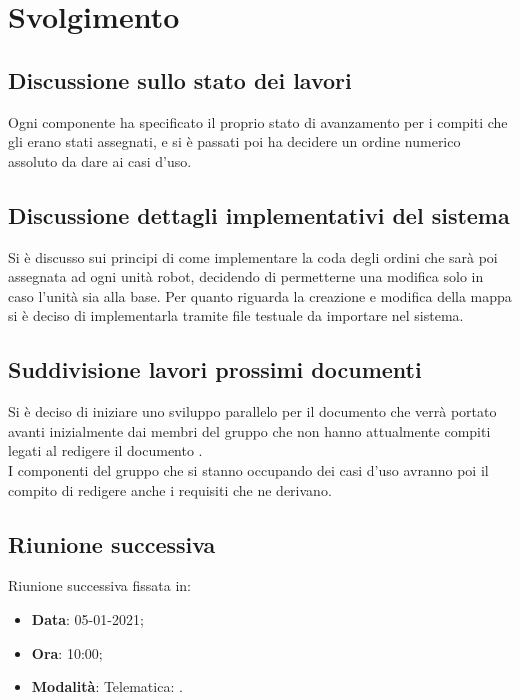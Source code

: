 \documentclass[]{article}
\begin{document}
	\newpage

	\section{Svolgimento}
		\subsection{Discussione sullo stato dei lavori}
        Ogni componente ha specificato il proprio stato di avanzamento per i compiti che gli erano stati assegnati, e si è passati poi ha decidere un ordine numerico assoluto da dare ai casi d'uso.\\

        \subsection{Discussione dettagli implementativi del sistema}
        Si è discusso sui principi di come implementare la coda degli ordini che sarà poi assegnata ad ogni unità robot, decidendo di permetterne una modifica solo in caso l'unità sia alla base. Per quanto riguarda la creazione e modifica della mappa si è deciso di implementarla tramite file testuale da importare nel sistema.\\
        
        \subsection{Suddivisione lavori prossimi documenti}
        Si è deciso di iniziare uno sviluppo parallelo per il documento  che verrà portato avanti inizialmente dai membri del gruppo che non hanno attualmente compiti legati al redigere il documento . \\
        I componenti del gruppo che si stanno occupando dei casi d'uso avranno poi il compito di redigere anche i requisiti che ne derivano.\\

		\subsection{Riunione successiva}
		Riunione successiva fissata in:
		\begin{itemize}
			\item \textbf{Data}: 05-01-2021;
			\item \textbf{Ora}: 10:00;
			\item \textbf{Modalità}: Telematica: .
		\end{itemize}
\end{document}
